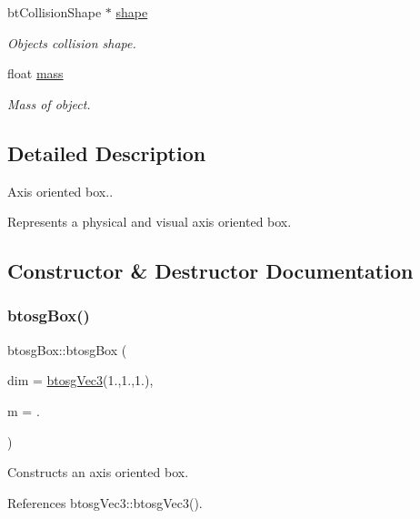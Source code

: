 \begin{DoxyCompactItemize}
bt\+Collision\+Shape $\ast$ \hyperlink{classbtosgObject_a0f6a8da01cf643c321bffe86e42604b0}{shape}
\begin{DoxyCompactList}\small\item\em Object\textquotesingle{}s collision shape. \end{DoxyCompactList}\item 
float \hyperlink{classbtosgObject_a2418bb2194d5e9b0f1c51c84672ba7d1}{mass}
\begin{DoxyCompactList}\small\item\em Mass of object. \end{DoxyCompactList}\end{DoxyCompactItemize}


\subsection{Detailed Description}
Axis oriented box.. 

Represents a physical and visual axis oriented box. 

\subsection{Constructor \& Destructor Documentation}
\mbox{\label{classbtosgBox_aaffbdeeac3ee040dea98c19b538f0e49}} 
\subsubsection{\texorpdfstring{btosg\+Box()}{btosgBox()}\hspace{0.1cm}{\footnotesize\ttfamily [1/3]}}
{\footnotesize\ttfamily btosg\+Box\+::btosg\+Box (\begin{DoxyParamCaption}\item[{\hyperlink{classbtosgVec3}{btosg\+Vec3}}]{dim = {\ttfamily \hyperlink{classbtosgVec3}{btosg\+Vec3}(1.,1.,1.)},  }\item[{double}]{m = {.} }\end{DoxyParamCaption})\hspace{0.3cm}{\ttfamily [inline]}}

Constructs an axis oriented box. 

References btosg\+Vec3\+::btosg\+Vec3().

\mbox{\label{classbtosgBox_a0b7809cf498d50ced7c6e4a1bf0f5470}} 
